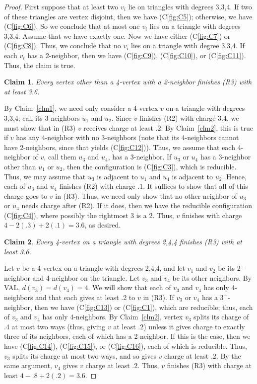 \documentclass[12pt]{article}
\theoremstyle{plain}
\newtheorem{clm}{Claim}
\theoremstyle{definition}
\theoremstyle{remark}
\begin{document}
\begin{proof}
	First suppose that at least two $v_i$ lie on triangles with degrees 3,3,4.
	If two of these triangles are vertex disjoint, then we have (C\ref{fig:C5});
	otherwise, we have (C\ref{fig:C6}).  So we conclude that at most one $v_i$ lies
	on a triangle with degrees 3,3,4.  Assume that we have exactly one.
	Now we have either (C\ref{fig:C7}) or (C\ref{fig:C8}).  Thus, we conclude that
	no $v_i$ lies on a triangle with degree 3,3,4.  If each $v_i$ has a
	2-neighbor, then we have (C\ref{fig:C9}), (C\ref{fig:C10}), or (C\ref{fig:C11}).
	Thus, the claim is true.
	
	\begin{clm}
		Every vertex other than a 4-vertex with a 2-neighbor finishes (R3) with at least 3.6.
		\label{clm3}
	\end{clm}
	By Claim~\ref{clm1}, we need only consider a 4-vertex $v$ on a triangle with
	degrees 3,3,4; call its 3-neighbors $u_1$ and $u_2$.
	Since $v$ finishes (R2) with charge $3.4$, we must show that in
	(R3) $v$ receives charge at least $.2$.  By Claim~\ref{clm2}, this is true if
	$v$ has any 4-neighbor with no 3-neighbors (note that its 4-neighbors cannot
	have 2-neighbors, since that yields (C\ref{fig:C12})).  Thus, we assume that each
	4-neighbor of $v$, call them $u_3$ and $u_4$, has a 3-neighbor.  If $u_3$ or
	$u_4$ has a 3-neighbor other than $u_1$ or $u_2$, then the configuration is
	(C\ref{fig:C3}), which is reducible.  Thus, we may assume that $u_3$ is adjacent
	to $u_1$ and $u_4$ is adjacent to $u_2$.  Hence, each of $u_3$ and $u_4$
	finishes (R2) with charge $.1$.  It suffices to show that
	all of this charge goes to $v$ in (R3).  Thus, we need only show that no other
	neighbor of $u_3$ or $u_4$ needs charge after (R2).  If it does, then we have
	the reducible configuration (C\ref{fig:C4}), where possibly the rightmost 3 is a
	2.  Thus, $v$ finishes with charge $4-2(.3)+2(.1)=3.6$, as desired.
	
	\begin{clm}
		Every 4-vertex on a triangle with degrees 2,4,4 finishes (R3) with at least 3.6.
		\label{clm4}
	\end{clm}
	Let $v$ be a 4-vertex on a triangle with degrees 2,4,4, and let $v_1$ and $v_2$
	be its 2-neighbor and 4-neighbor on the triangle.  Let $v_3$ and $v_4$ be its
	other neighbors.  By VAL, $d(v_3)=d(v_4)=4$.  We will show that each of $v_3$
	and $v_4$ has only 4-neighbors and that each gives at least .2 to $v$ in (R3).
	If $v_3$ or $v_4$ has a $3^-$-neighbor, then we have (C\ref{fig:C13}) or
	(C\ref{fig:C1}), which are
	reducible; thus, each of $v_3$ and $v_4$ has only 4-neighbors.  By
	Claim~\ref{clm2}, vertex $v_3$ splits its charge of .4 at most two ways (thus,
	giving $v$ at least $.2$) unless it gives charge to exactly three of its
	neighbors, each of which has a 2-neighbor.  If this is the case, then we have
	(C\ref{fig:C14}), (C\ref{fig:C15}), or (C\ref{fig:C16}), each of which is
	reducible.  Thus, $v_3$ splits its charge at most two ways, and so gives $v$
	charge at least $.2$.  By the same argument, $v_4$ gives $v$ charge at least
	$.2$.  Thus, $v$ finishes (R3) with charge at least $4-.8+2(.2)=3.6$.
	\bigskip
	

\end{proof}
\end{document}
